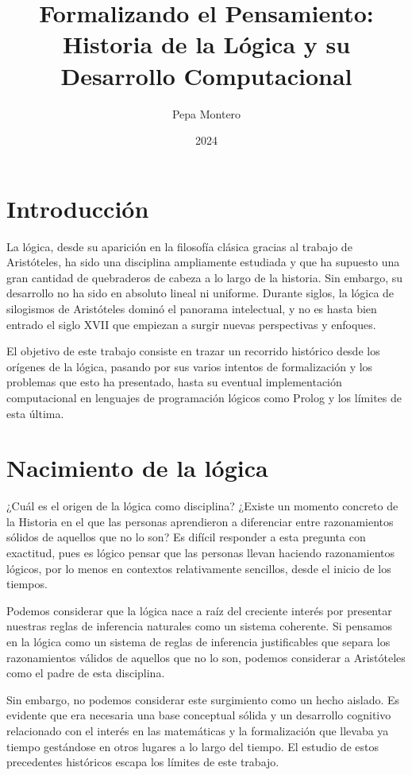\documentclass{article}
\title{Formalizando el Pensamiento: Historia de la Lógica y su Desarrollo Computacional}
\author{Pepa Montero}
\date{2024}
\begin{document}
\maketitle


\hspace{40 mm}

\section{Introducción}

La lógica, desde su aparición en la filosofía clásica gracias al trabajo de Aristóteles, ha sido una disciplina ampliamente estudiada y que ha supuesto una gran cantidad de quebraderos de cabeza a lo largo de la historia. Sin embargo, su desarrollo no ha sido en absoluto lineal ni uniforme. Durante siglos, la lógica de silogismos de Aristóteles dominó el panorama intelectual, y no es hasta bien entrado el siglo XVII que empiezan a surgir nuevas perspectivas y enfoques.

El objetivo de este trabajo consiste en trazar un recorrido histórico desde los orígenes de la lógica, pasando por sus varios intentos de formalización y los problemas que esto ha presentado, hasta su eventual implementación computacional en lenguajes de programación lógicos como Prolog y los límites de esta última.

\section{Nacimiento de la lógica}

¿Cuál es el origen de la lógica como disciplina? ¿Existe un momento concreto de la Historia en el que las personas aprendieron a diferenciar entre razonamientos sólidos de aquellos que no lo son? Es difícil responder a esta pregunta con exactitud, pues es lógico pensar que las personas llevan haciendo razonamientos lógicos, por lo menos en contextos relativamente sencillos, desde el inicio de los tiempos.

\newpage

Podemos considerar que la lógica nace a raíz del creciente interés por presentar nuestras reglas de inferencia naturales como un sistema coherente. Si pensamos en la lógica como un sistema de reglas de inferencia justificables que separa los razonamientos válidos de aquellos que no lo son, podemos considerar a Aristóteles como el padre de esta disciplina\cite{moravcsik2004logic}. 

Sin embargo, no podemos considerar este surgimiento como un hecho aislado. Es evidente que era necesaria una base conceptual sólida y un desarrollo cognitivo relacionado con el interés en las matemáticas y la formalización que llevaba ya tiempo gestándose en otros lugares a lo largo del tiempo. El estudio de estos precedentes históricos escapa los límites de este trabajo.
\end{document}
